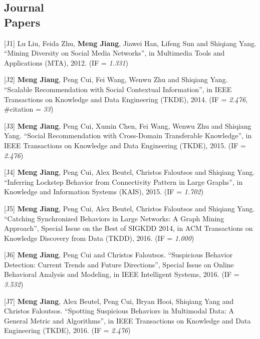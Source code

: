 \documentclass[margin, 10pt]{res}
\begin{document}
\begin{resume}

\section{Journal \\ Papers}

[J1] Lu Liu, Feida Zhu, {\bf Meng Jiang}, Jiawei Han, Lifeng Sun and Shiqiang Yang. ``Mining Diversity on Social Media Networks'', in Multimedia Tools and Applications (MTA), 2012. (IF = {\em 1.331})

[J2] {\bf Meng Jiang}, Peng Cui, Fei Wang, Wenwu Zhu and Shiqiang Yang. ``Scalable Recommendation with Social Contextual Information'', in IEEE Transactions on Knowledge and Data Engineering (TKDE), 2014. (IF = {\em 2.476}, \#citation = {\em 33})

[J3] {\bf Meng Jiang}, Peng Cui, Xumin Chen, Fei Wang, Wenwu Zhu and Shiqiang Yang. ``Social Recommendation with Cross-Domain Transferable Knowledge'', in IEEE Transactions on Knowledge and Data Engineering (TKDE), 2015. (IF = {\em 2.476})

[J4] {\bf Meng Jiang}, Peng Cui, Alex Beutel, Christos Faloutsos and Shiqiang Yang. ``Inferring Lockstep Behavior from Connectivity Pattern in Large Graphs'', in Knowledge and Information Systems (KAIS), 2015. (IF = {\em 1.702})

[J5] {\bf Meng Jiang}, Peng Cui, Alex Beutel, Christos Faloutsos and Shiqiang Yang. ``Catching Synchronized Behaviors in Large Networks: A Graph Mining Approach'', Special Issue on the Best of SIGKDD 2014, in ACM Transactions on Knowledge Discovery from Data (TKDD), 2016. (IF = {\em 1.000})

[J6] {\bf Meng Jiang}, Peng Cui and Christos Faloutsos. ``Suspicious Behavior Detection: Current Trends and Future Directions'', Special Issue on Online Behavioral Analysis and Modeling, in IEEE Intelligent Systems, 2016. (IF = {\em 3.532})

[J7] {\bf Meng Jiang}, Alex Beutel, Peng Cui, Bryan Hooi, Shiqiang Yang and Christos Faloutsos. ``Spotting Suspicious Behaviors in Multimodal Data: A General Metric and Algorithms'', in IEEE Transactions on Knowledge and Data Engineering (TKDE), 2016. (IF = {\em 2.476})



\end{resume}
\end{document}
